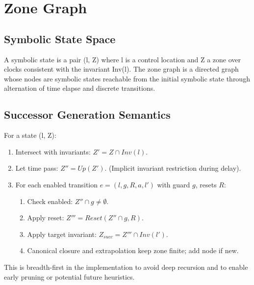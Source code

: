 \section{Zone Graph}
\subsection{Symbolic State Space}
A symbolic state is a pair (l, Z) where l is a control location and Z a zone over clocks consistent with the invariant Inv(l). The zone graph is a directed graph whose nodes are symbolic states reachable from the initial symbolic state through alternation of time elapse and discrete transitions.

\subsection{Successor Generation Semantics}
For a state (l, Z):
\begin{enumerate}
    \item Intersect with invariants: \(Z' = Z \cap Inv(l)\).
    \item Let time pass: \(Z'' = Up(Z')\). (Implicit invariant restriction during delay).
    \item For each enabled transition \(e = (l, g, R, a, l')\) with guard \(g\), resets \(R\):
    \begin{enumerate}
    \item Check enabled: \(Z'' \cap g \neq \emptyset\).
    \item Apply reset: \(Z''' = Reset(Z'' \cap g, R)\).
    \item Apply target invariant: \(Z_{succ} = Z''' \cap Inv(l')\).
      \item Canonical closure and extrapolation keep zone finite; add node if new.
    \end{enumerate}
\end{enumerate}
This is breadth-first in the implementation to avoid deep recursion and to enable early pruning or potential future heuristics.

